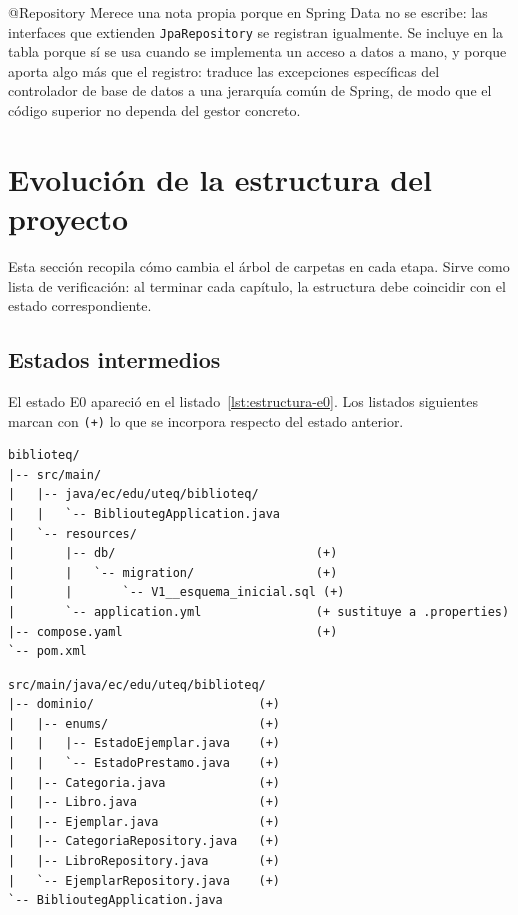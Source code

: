 \documentclass[11pt,a4paper,openany]{book}
\begin{document}
\begin{cajadefinicion}{@Repository}
	Merece una nota propia porque en Spring Data no se escribe: las interfaces que extienden \texttt{JpaRepository} se registran igualmente. Se incluye en la tabla porque sí se usa cuando se implementa un acceso a datos a mano, y porque aporta algo más que el registro: traduce las excepciones específicas del controlador de base de datos a una jerarquía común de Spring, de modo que el código superior no dependa del gestor concreto.
\end{cajadefinicion}

\section{Evolución de la estructura del proyecto}
\label{sec:evolucion}

Esta sección recopila cómo cambia el árbol de carpetas en cada etapa. Sirve como lista de verificación: al terminar cada capítulo, la estructura debe coincidir con el estado correspondiente.

\subsection{Estados intermedios}
\label{sec:estados}

El estado E0 apareció en el listado~\ref{lst:estructura-e0}. Los listados siguientes marcan con \texttt{(+)} lo que se incorpora respecto del estado anterior.

\begin{lstlisting}[style=plano,caption={Estado E1 --- tras configurar la base y la primera migracion (capitulos 2 y 4).},label={lst:e1}]
biblioteq/
|-- src/main/
|   |-- java/ec/edu/uteq/biblioteq/
|   |   `-- BiblioutegApplication.java
|   `-- resources/
|       |-- db/                            (+)
|       |   `-- migration/                 (+)
|       |       `-- V1__esquema_inicial.sql (+)
|       `-- application.yml                (+ sustituye a .properties)
|-- compose.yaml                           (+)
`-- pom.xml
\end{lstlisting}

\begin{lstlisting}[style=plano,caption={Estado E2 --- tras escribir entidades y repositorios (capitulo 4).},label={lst:e2}]
src/main/java/ec/edu/uteq/biblioteq/
|-- dominio/                       (+)
|   |-- enums/                     (+)
|   |   |-- EstadoEjemplar.java    (+)
|   |   `-- EstadoPrestamo.java    (+)
|   |-- Categoria.java             (+)
|   |-- Libro.java                 (+)
|   |-- Ejemplar.java              (+)
|   |-- CategoriaRepository.java   (+)
|   |-- LibroRepository.java       (+)
|   `-- EjemplarRepository.java    (+)
`-- BiblioutegApplication.java
\end{lstlisting}
\end{document}
